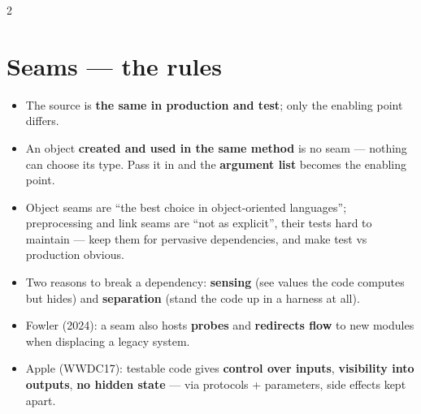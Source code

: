 \documentclass[8pt]{extarticle}
\begin{document}
\begin{multicols}{2}
\raggedright
\footnotesize{}

\section{Seams — the rules}
\begin{itemize}
  \item The source is \textbf{the same in production and test}; only the enabling point differs.
  \item An object \textbf{created and used in the same method} is no seam — nothing can choose
        its type. Pass it in and the \textbf{argument list} becomes the enabling point.
  \item Object seams are ``the best choice in object-oriented languages''; preprocessing and link
        seams are ``not as explicit'', their tests hard to maintain — keep them for pervasive
        dependencies, and make test vs production obvious.
  \item Two reasons to break a dependency: \textbf{sensing} (see values the code computes but
        hides) and \textbf{separation} (stand the code up in a harness at all).
  \item Fowler (2024): a seam also hosts \textbf{probes} and \textbf{redirects flow} to new
        modules when displacing a legacy system.
  \item Apple (WWDC17): testable code gives \textbf{control over inputs}, \textbf{visibility into
        outputs}, \textbf{no hidden state} — via protocols + parameters, side effects kept apart.
\end{itemize}


\end{multicols}
\end{document}
